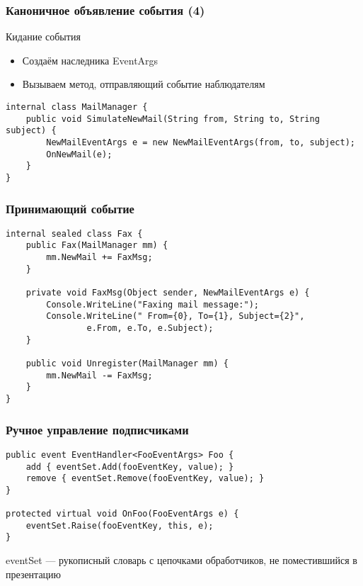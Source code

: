 \documentclass[xetex,mathserif,serif]{beamer}
\begin{document}
	\begin{frame}[fragile]
		\frametitle{Каноничное объявление события (4)}
		Кидание события
		\begin{itemize}
			\item Создаём наследника EventArgs
			\item Вызываем метод, отправляющий событие наблюдателям
		\end{itemize}
		\vspace{5mm}
		\begin{verbatim}
internal class MailManager {
    public void SimulateNewMail(String from, String to, String subject) {
        NewMailEventArgs e = new NewMailEventArgs(from, to, subject);
        OnNewMail(e);
    }
}
		\end{verbatim}
	\end{frame}

	\begin{frame}[fragile]
		\frametitle{Принимающий событие}
		\begin{verbatim}
internal sealed class Fax {
    public Fax(MailManager mm) {
        mm.NewMail += FaxMsg;
    }

    private void FaxMsg(Object sender, NewMailEventArgs e) {
        Console.WriteLine("Faxing mail message:");
        Console.WriteLine(" From={0}, To={1}, Subject={2}",
                e.From, e.To, e.Subject);
    }

    public void Unregister(MailManager mm) {
        mm.NewMail -= FaxMsg;
    }
}
		\end{verbatim}
	\end{frame}

	\begin{frame}[fragile]
		\frametitle{Ручное управление подписчиками}
		\begin{verbatim}
public event EventHandler<FooEventArgs> Foo {
    add { eventSet.Add(fooEventKey, value); }
    remove { eventSet.Remove(fooEventKey, value); }
}

protected virtual void OnFoo(FooEventArgs e) {
    eventSet.Raise(fooEventKey, this, e);
}
		\end{verbatim}
		\vspace{7mm}
		eventSet --- рукописный словарь с цепочками обработчиков, не поместившийся в презентацию
	\end{frame}
\end{document}

